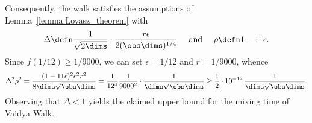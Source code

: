 \noindent Consequently, the walk  satisfies the assumptions of Lemma~\ref{lemma:Lovasz_theorem} with
\begin{align*}
	\Delta \defn \frac{1}{\sqrt{2\dims}} \cdot \frac{r\epsilon} {2(\obs\dims)^{1/4}} \quad \text{ and }\quad \rho \defn 1-11\epsilon.
\end{align*}
Since $f(1/12) \geq 1/9000$, we can set $\epsilon = 1/12$ and $r = {1}/{9000}$, whence
\begin{align*}
	\Delta^2\rho^2 = \frac{(1-11\epsilon)^2\epsilon^2r^2}{8\dims\sqrt{\obs\dims}} = \frac{1}{12^4} \frac{1}{9000^2} \cdot\frac{1}{\dims\sqrt{\obs\dims}} \geq \frac{1}{2} \cdot 10^{-12} \, \frac{1}{\dims\sqrt{\obs\dims}}.
\end{align*}
Observing that $\Delta <1$ yields the claimed upper bound for the mixing time of Vaidya Walk.




